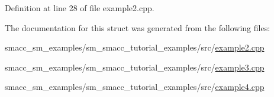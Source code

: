 Definition at line 28 of file example2.\+cpp.



The documentation for this struct was generated from the following files\+:\begin{DoxyCompactItemize}
\item 
smacc\+\_\+sm\+\_\+examples/sm\+\_\+smacc\+\_\+tutorial\+\_\+examples/src/\hyperlink{example2_8cpp}{example2.\+cpp}\item 
smacc\+\_\+sm\+\_\+examples/sm\+\_\+smacc\+\_\+tutorial\+\_\+examples/src/\hyperlink{example3_8cpp}{example3.\+cpp}\item 
smacc\+\_\+sm\+\_\+examples/sm\+\_\+smacc\+\_\+tutorial\+\_\+examples/src/\hyperlink{example4_8cpp}{example4.\+cpp}\end{DoxyCompactItemize}
